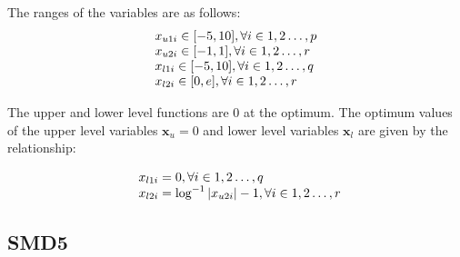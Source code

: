The ranges of the variables are as follows:
\begin{equation}
\begin{array}{lr}
$$x_{u1i} \in  [-5,10],          \forall i \in {1,2\ldots,p}$$\\
$$x_{u2i} \in  [-1,1],          \forall i \in {1,2\ldots,r}$$\\
$$x_{l1i} \in  [-5,10],          \forall i \in {1,2\ldots,q}$$\\
$$x_{l2i} \in  [0,e],          \forall i \in {1,2\ldots,r}$$
\end{array}
\label{smd_4_sub}
\end{equation}


The upper and lower level functions are 0 at the optimum. The optimum values of the upper level variables $\mathbf{x}_u=0$ and lower level variables $\mathbf{x}_l$ are given by the relationship: 

\begin{equation}
\begin{array}{lr}
\text{}\hspace{2mm} x_{l1i}=0,  \forall i \in {1,2\ldots,q} \\
\text{}\hspace{2mm} x_{l2i}=\log^{-1} |x_{u2i}| -1,  \forall i \in {1,2\ldots,r} \\
\end{array}
\label{basic_4}
\end{equation}


\subsection{SMD5}

